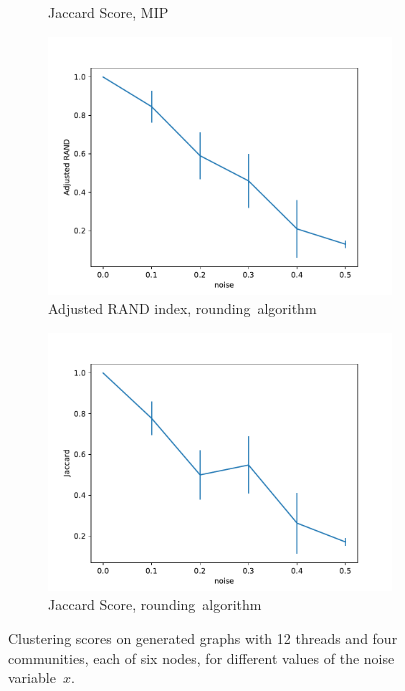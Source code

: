 \begin{figure}
\begin{center}
\begin{subfigure}[b]{0.4\textwidth}
			\caption{Jaccard Score, MIP}
			\label{fig:tex/out/synthetic_exact/_noise_jaccard.pdf}
		\end{subfigure}
		\begin{subfigure}[b]{0.4\textwidth}
			\centering
			\includegraphics[width=\textwidth]{tex/out/synthetic_12t/model2_noise_adj_rand.pdf}
			\caption{Adjusted RAND index, \mbox{rounding algorithm}}
			\label{fig:tex/out/synthetic_exact/model2_noise_adj_rand.pdf}
		\end{subfigure}
		\quad
		\begin{subfigure}[b]{0.4\textwidth}
			\centering
			\includegraphics[width=\textwidth]{tex/out/synthetic_12t/model2_noise_jaccard.pdf}
			\caption{Jaccard Score, \mbox{rounding algorithm}}
			\label{fig:tex/out/synthetic_exact/_noise_jaccard.pdf}
		\end{subfigure}
	\end{center}
	\caption{Clustering scores on generated graphs with 12 threads and four communities, each
		of six nodes, for different values of the noise
		variable~$x$.}
	\label{fig:clustering-mip-rounding}
\end{figure}

